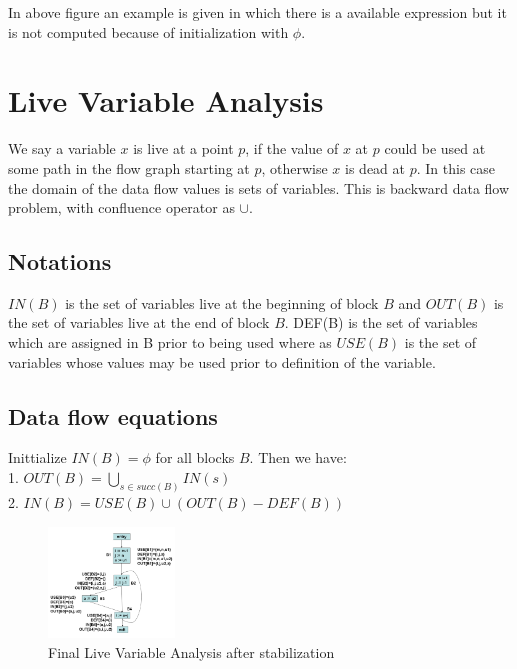 \documentclass{article}
\begin{document}
In above figure an example is given in which there is a available expression but it is not computed because of initialization with $\phi$. \\

\section*{Live Variable Analysis}
We say a variable $x$ is live at a point $p$, if the value of $x$ at $p$ could be used at some path in the flow graph starting at $p$, otherwise $x$ is dead at $p$. In this case the domain of the data flow values is sets of variables. This is backward data flow problem, with confluence operator as $\cup$. \\

\subsection*{Notations}
$IN(B)$ is the set of variables live at the beginning of block $B$ and $OUT(B)$ is the set of variables live at the end of block $B$. DEF(B) is the set of variables which are assigned in B prior to being used where as $USE(B)$ is the set of variables whose values may be used prior to definition of the variable. \\

\subsection*{Data flow equations}
Inittialize $IN(B) = \phi$ for all blocks $B$. Then we have: \\
1. $OUT(B) = \bigcup_{s \in succ(B)} IN(s)$ \\
2. $IN(B) = USE(B) \cup (OUT(B) - DEF(B))$ \\

\begin{figure}[h]
    \centering
    \includegraphics[width=0.3\textwidth]{Images/live.png}
    \caption{Final Live Variable Analysis after stabilization}
    \label{fig:LiveVariableAnalysis}
\end{figure}
\end{document}
